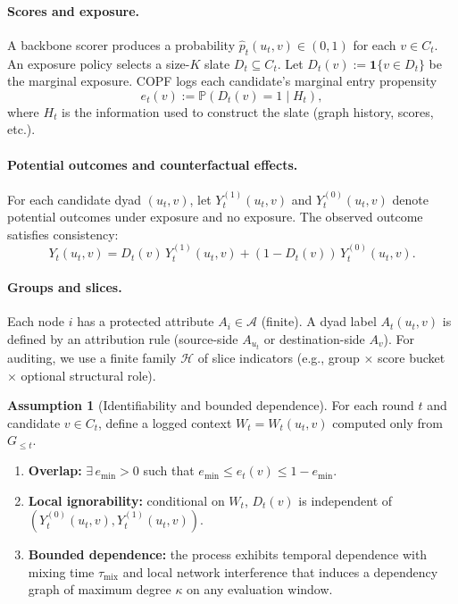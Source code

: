 \documentclass[11pt]{article}
\newcommand{\Pp}{\mathbb{P}}
\newcommand{\1}{\mathbf{1}}
\newcommand{\cA}{\mathcal{A}}
\newcommand{\cH}{\mathcal{H}}
\theoremstyle{plain}
\theoremstyle{definition}
\newtheorem{assumption}[theorem]{Assumption}
\theoremstyle{remark}
\begin{document}
\paragraph{Scores and exposure.}
A backbone scorer produces a probability $\hat p_t(u_t,v)\in(0,1)$ for each $v\in C_t$.
An exposure policy selects a size-$K$ slate $D_t\subseteq C_t$.
Let $D_t(v):=\1\{v\in D_t\}$ be the marginal exposure.
COPF logs each candidate's marginal entry propensity
\[e_t(v) := \Pp(D_t(v)=1\mid H_t),\]
where $H_t$ is the information used to construct the slate (graph history, scores, etc.).

\paragraph{Potential outcomes and counterfactual effects.}
For each candidate dyad $(u_t,v)$, let $Y_t^{(1)}(u_t,v)$ and $Y_t^{(0)}(u_t,v)$ denote
potential outcomes under exposure and no exposure.
The observed outcome satisfies consistency:
\[Y_t(u_t,v) = D_t(v)\,Y_t^{(1)}(u_t,v) + (1-D_t(v))\,Y_t^{(0)}(u_t,v).\]

\paragraph{Groups and slices.}
Each node $i$ has a protected attribute $A_i\in\cA$ (finite).
A dyad label $A_t(u_t,v)$ is defined by an attribution rule (source-side $A_{u_t}$ or destination-side $A_v$).
For auditing, we use a finite family $\cH$ of slice indicators
(e.g., group $\times$ score bucket $\times$ optional structural role).

\begin{assumption}[Identifiability and bounded dependence]\label{ass:ident}
For each round $t$ and candidate $v\in C_t$, define a logged context $W_t=W_t(u_t,v)$ computed only from $G_{\le t}$.
\begin{enumerate}[leftmargin=2em]
\item \textbf{Overlap:} $\exists\,e_{\min}>0$ such that $e_{\min}\le e_t(v)\le 1-e_{\min}$.
\item \textbf{Local ignorability:} conditional on $W_t$, $D_t(v)$ is independent of $(Y_t^{(0)}(u_t,v),Y_t^{(1)}(u_t,v))$.
\item \textbf{Bounded dependence:} the process exhibits temporal dependence with mixing time $\tau_{\mathrm{mix}}$ and
local network interference that induces a dependency graph of maximum degree $\kappa$ on any evaluation window.
\end{enumerate}
\end{assumption}
\end{document}
